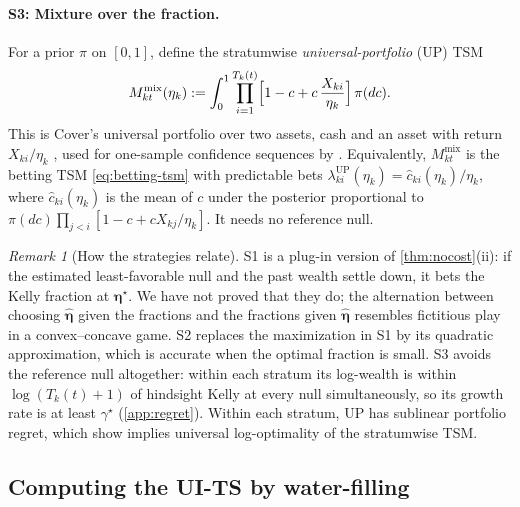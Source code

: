 \documentclass[11pt]{article}
\newcommand{\bs}{\boldsymbol}
\newcommand{\up}{\mathrm{UP}}
\newcommand{\mix}{\mathrm{mix}}
\theoremstyle{plain}
\theoremstyle{definition}
\theoremstyle{remark}
\newtheorem{remark}[theorem]{Remark}
\begin{document}
\paragraph{S3: Mixture over the fraction.}  For a prior $\pi$ on $[0,1]$, define the stratumwise
\emph{universal-portfolio} (UP) TSM
\begin{equation}\label{eq:up}
M^{\mix}_{kt}(\eta_k) := \int_0^1 \prod_{i=1}^{T_k(t)}\Bigl[1-c+c\,\frac{X_{ki}}{\eta_k}\Bigr]\,\pi(dc).
\end{equation}
This is Cover's universal portfolio over two assets, cash and an asset with return $X_{ki}/\eta_k$
\citep{cover1991universal, cover1996universal}, used for one-sample confidence sequences by
\citet{orabona2024tight}.  Equivalently, $M^{\mix}_{kt}$ is the betting TSM \eqref{eq:betting-tsm} with predictable bets
$\lambda^{\up}_{ki}(\eta_k)=\hat c_{ki}(\eta_k)/\eta_k$, where $\hat c_{ki}(\eta_k)$ is the mean of $c$ under the
posterior proportional to $\pi(dc)\prod_{j<i}[1-c+cX_{kj}/\eta_k]$.  It needs no reference null.

\begin{remark}[How the strategies relate]\label{rem:strategies}
S1 is a plug-in version of \cref{thm:nocost}(ii): if the estimated least-favorable null and the past wealth settle
down, it bets the Kelly fraction at $\bs\eta^\star$.  We have not proved that they do; the alternation between choosing
$\hat{\bs\eta}$ given the fractions and the fractions given $\hat{\bs\eta}$ resembles fictitious play in a convex--concave
game.  S2 replaces the maximization in S1 by its quadratic approximation, which is accurate when the optimal fraction
is small.  S3 avoids the reference null altogether: within each stratum its log-wealth is within $\log(T_k(t)+1)$ of
hindsight Kelly at every null simultaneously, so its growth rate is at least $\gamma^\star$ (\cref{app:regret}).  Within each stratum, UP has sublinear portfolio regret,
which \citet{waudbysmith2025universal} show implies universal log-optimality of the stratumwise TSM.
\end{remark}

\subsection{Computing the UI-TS by water-filling}\label{sec:waterfill}
\end{document}
